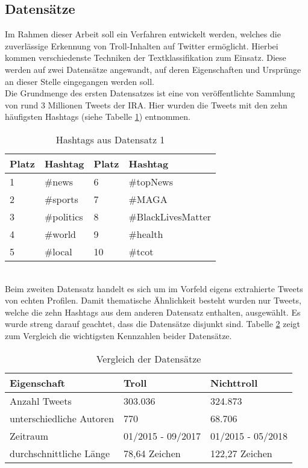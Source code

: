 \subsection{Datensätze}
Im Rahmen dieser Arbeit soll ein Verfahren entwickelt werden, welches die zuverlässige Erkennung von Troll-Inhalten auf Twitter ermöglicht. Hierbei kommen verschiedenste Techniken der Textklassifikation zum Einsatz. Diese werden auf zwei Datensätze angewandt, auf deren Eigenschaften und Ursprünge an dieser Stelle eingegangen werden soll.\\
Die Grundmenge des ersten Datensatzes ist eine von \citet{LinWar18} veröffentlichte Sammlung von rund 3 Millionen Tweets der IRA. Hier wurden die Tweets mit den zehn häufigsten Hashtags (siehe Tabelle \ref{tab_toptweets}) entnommen.\\
\begin{table}[htb]
	\begin{center}
		\begin{tabular}{|l|l||l|l|}
			\hline
			Platz & Hashtag & Platz & Hashtag \\ \hline \hline
			1	& \#news	  & 6	& \#topNews\\ 
			2	& \#sports & 7   & \#MAGA\\
			3   & \#politics & 8 & \#BlackLivesMatter\\
			4   & \#world	& 9 & \#health\\
			5	& \#local	& 10 & \#tcot\\ \hline			
		\end{tabular}
		\caption{Hashtags aus Datensatz 1}\label{tab_toptweets}
	\end{center}
\end{table}\\
Beim zweiten Datensatz handelt es sich um im Vorfeld eigens extrahierte Tweets von echten Profilen. Damit thematische Ähnlichkeit besteht wurden nur Tweets, welche die zehn Hashtags aus dem anderen Datensatz enthalten, ausgewählt. Es wurde streng darauf geachtet, dass die Datensätze disjunkt sind. Tabelle \ref{tab_datasets} zeigt zum Vergleich die wichtigsten Kennzahlen beider Datensätze.
\begin{table}[htb]
	\begin{center}
		\begin{tabular}{|l|l|l|}
			\hline
		Eigenschaft					& Troll		& Nichttroll\\ \hline \hline
		Anzahl Tweets   			& 303.036	& 324.873	\\ \hline
		unterschiedliche Autoren    & 770		& 68.706		\\ \hline
		Zeitraum					& 01/2015 - 09/2017& 01/2015 - 05/2018\\ \hline
		durchschnittliche Länge		& 78,64 Zeichen	& 122,27 Zeichen\\ \hline
		\end{tabular}
		\caption{Vergleich der Datensätze}\label{tab_datasets}
	\end{center}
\end{table}
\pagebreak
